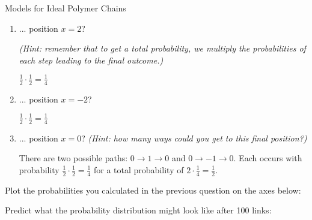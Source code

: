 \begin{activity}{Models for Ideal Polymer Chains}
\begin{ctqs}
\begin{enumerate}
			\item ... position $x=2$?
			
				\emph{(Hint: remember that to get a total probability, we \emph{multiply} the probabilities of each step leading to the final outcome.)}
				
				\begin{solution}[1in]
				
					$\frac{1}{2}\cdot\frac{1}{2} = \frac{1}{4}$
				
				\end{solution}
				
			\item ... position $x=-2$?
				
				\begin{solution}[1in]
				
					$\frac{1}{2}\cdot\frac{1}{2} = \frac{1}{4}$
					
				\end{solution}
			
			\clearpage
			\item ... position $x=0$?
				\emph{(Hint: how many ways could you get to this final position?)}
				
				\begin{solution}[1in]
				
					There are two possible paths: $0\to 1\to 0$ and $0 \to -1 \to 0$.  Each occurs with probability $\frac{1}{2}\cdot\frac{1}{2} = \frac{1}{4}$ for a total probability of $2\cdot\frac{1}{4} = \frac{1}{2}$.
				
				\end{solution}
			
		\end{enumerate}
		
	\question Plot the probabilities you calculated in the previous question on the axes below:
	
		\begin{solution}[2.25in]
		\end{solution}
	
	\question Predict what the probability distribution might look like after 100 links:
	
		\begin{solution}[2.25in]
		\end{solution}
	

\end{ctqs}
\end{activity}

